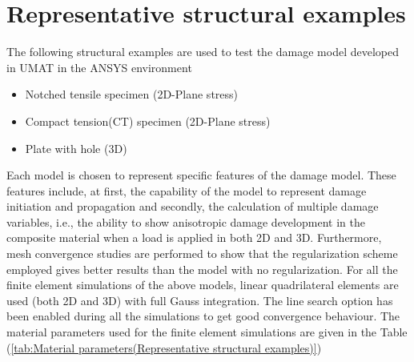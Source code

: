 \documentclass[a4paper,12pt,twoside]{report}
\begin{document}
\section{Representative structural examples}
\indent\indent\indent The following structural examples are used to test the damage model developed in UMAT in the ANSYS environment
\begin{itemize}
\item Notched tensile specimen (2D-Plane stress)
\item Compact tension(CT) specimen (2D-Plane stress)
\item Plate with hole (3D)
\end{itemize}
Each model is chosen to represent specific features of the damage model. These features include, at first, the capability of the model to represent damage initiation and propagation and secondly, the calculation of multiple damage variables, i.e., the ability to show anisotropic damage development in the composite material when a load is applied in both 2D and 3D. Furthermore, mesh convergence studies are performed to show that the regularization scheme employed gives better results than the model with no regularization. For all the finite element simulations of the above models, linear quadrilateral elements are used (both 2D and 3D) with full Gauss integration. The line search option has been enabled during all the simulations to get good convergence behaviour. The material parameters used for the finite element simulations are given in the Table (\ref{tab:Material parameters(Representative structural examples)})\\
\end{document}
